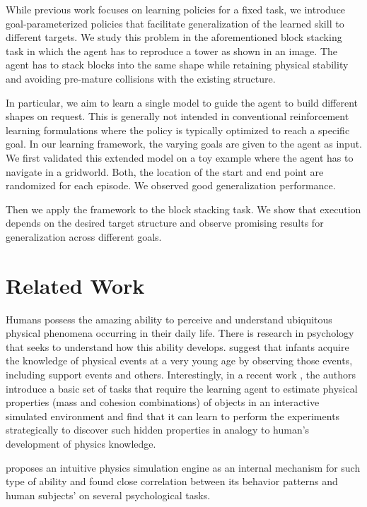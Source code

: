 \documentclass{article} %
\begin{document}
While previous work focuses on learning policies for a fixed task, we introduce goal-parameterized policies that facilitate generalization of the learned skill to different targets.
We study this problem in the aforementioned block stacking task in which the agent has to reproduce a tower as shown in an image. The agent has to stack blocks into the same shape while retaining physical stability and avoiding pre-mature collisions with the existing structure.

In particular, we aim to learn a single model to guide the agent to build different shapes on request. This is generally not intended in conventional reinforcement learning formulations where the policy is typically optimized to reach a specific goal. In our learning framework, the varying goals are given to the agent as input. We first validated this extended model on a toy example where the agent has to navigate in a gridworld. Both, the location of the start and end point are randomized for each episode. We observed good generalization performance. 

Then we apply the framework to the block stacking task. We show that execution depends on the desired target structure and observe promising results for generalization across different goals.
\section{Related Work}
Humans possess the amazing ability to perceive and understand ubiquitous physical phenomena occurring in their daily life. There is research in psychology that seeks to understand how this ability develops. \cite{baillargeon2002acquisition} suggest that infants acquire the knowledge of physical events at a very young age by observing those events, including support events and others. 
Interestingly, in a recent work \cite{denil2016learning}, the authors introduce a basic set of tasks that require the learning agent to estimate physical properties (mass and cohesion combinations) of objects in an interactive simulated environment and find that it can learn to perform the experiments strategically to discover such hidden properties in analogy to human's development of physics knowledge.

\cite{battaglia2013simulation} proposes an intuitive physics simulation engine as an internal mechanism for such type of ability and found close correlation between its behavior patterns and human subjects' on several psychological tasks.
\end{document}
